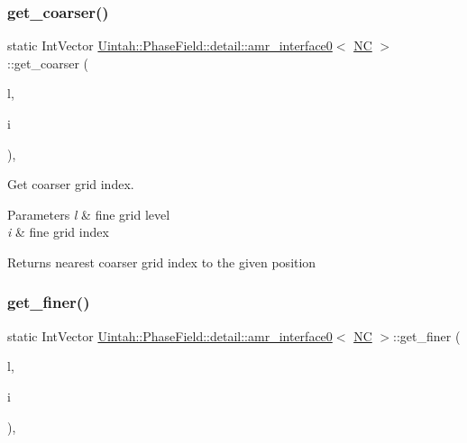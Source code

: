 \subsubsection{\texorpdfstring{get\+\_\+coarser()}{get\_coarser()}}
{\footnotesize\ttfamily static Int\+Vector \hyperlink{classUintah_1_1PhaseField_1_1detail_1_1amr__interface0}{Uintah\+::\+Phase\+Field\+::detail\+::amr\+\_\+interface0}$<$ \hyperlink{namespaceUintah_1_1PhaseField_a33d355affda78a83f45755ba8388cedda77924170fe82bfd58b74ca3e44139718}{NC} $>$\+::get\+\_\+coarser (\begin{DoxyParamCaption}\item[{const Level $\ast$}]{l,  }\item[{const Int\+Vector \&}]{i }\end{DoxyParamCaption})\hspace{0.3cm}{\ttfamily [inline]}, {\ttfamily [static]}}



Get coarser grid index. 


\begin{DoxyParams}{Parameters}
{\em l} & fine grid level \\
\hline
{\em i} & fine grid index \\
\hline
\end{DoxyParams}
\begin{DoxyReturn}{Returns}
nearest coarser grid index to the given position 
\end{DoxyReturn}
\mbox{\label{classUintah_1_1PhaseField_1_1detail_1_1amr__interface0_3_01NC_01_4_a474c01b32edcf2ba2dac72c35a63edba}} 
\subsubsection{\texorpdfstring{get\+\_\+finer()}{get\_finer()}}
{\footnotesize\ttfamily static Int\+Vector \hyperlink{classUintah_1_1PhaseField_1_1detail_1_1amr__interface0}{Uintah\+::\+Phase\+Field\+::detail\+::amr\+\_\+interface0}$<$ \hyperlink{namespaceUintah_1_1PhaseField_a33d355affda78a83f45755ba8388cedda77924170fe82bfd58b74ca3e44139718}{NC} $>$\+::get\+\_\+finer (\begin{DoxyParamCaption}\item[{const Level $\ast$}]{l,  }\item[{const Int\+Vector \&}]{i }\end{DoxyParamCaption})\hspace{0.3cm}{\ttfamily [inline]}, {\ttfamily [static]}}



